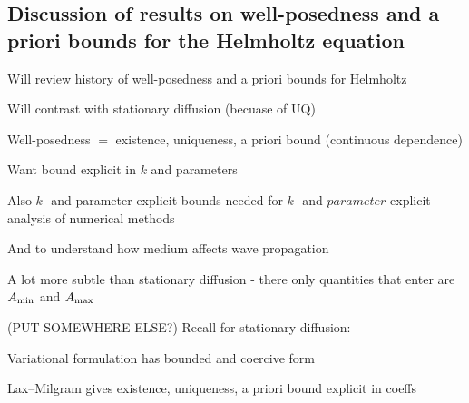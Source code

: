 \subsection{Discussion of results on well-posedness and a priori bounds for the Helmholtz equation}
\bit
\item Will review history of well-posedness and a priori bounds for Helmholtz
\item Will contrast with stationary diffusion (becuase of UQ)
  \eit

  \bit
\item Well-posedness $=$ existence, uniqueness, a priori bound (continuous dependence)
\item Want bound explicit in $k$ and parameters
  \item Also $k$- and parameter-explicit bounds needed for $k$- and $parameter$-explicit analysis of numerical methods
  \item And to understand how medium affects wave propagation
    \item A lot more subtle than stationary diffusion - there only quantities that enter are $A_{\min}$ and $A_{\max}$
  \eit

(PUT SOMEWHERE ELSE?) Recall for stationary diffusion:
\bit
\item Variational formulation has bounded and coercive form
\item Lax--Milgram gives existence, uniqueness, a priori bound explicit in coeffs
\eit
  
